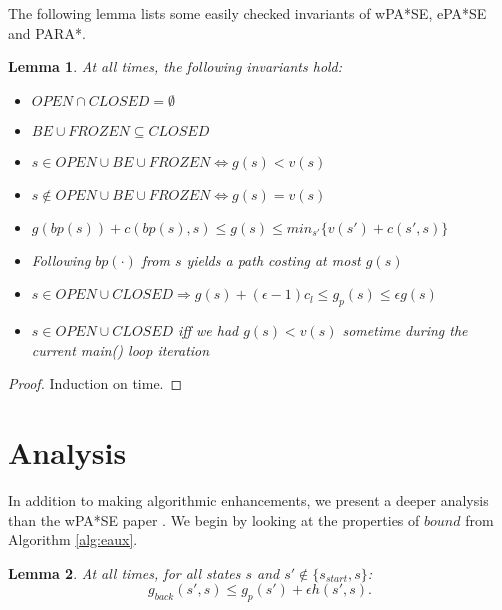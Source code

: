 \documentclass[letterpaper]{article}
\newtheorem{lemma}{Lemma}
\begin{document}
The following lemma lists some easily checked invariants of wPA*SE, ePA*SE and PARA*.

\begin{lemma}
\label{lem:prop}
At all times, the following invariants hold:
\begin{itemize}
\item $OPEN\cap CLOSED = \emptyset$
\item $BE\cup FROZEN \subseteq CLOSED$
\item $s\in OPEN\cup BE\cup FROZEN \Leftrightarrow g(s) < v(s)$
\item $s\notin OPEN\cup BE\cup FROZEN \Leftrightarrow g(s) = v(s)$
\item $g(bp(s)) + c(bp(s),s) \le g(s) \le min_{s'}\{v(s') + c(s',s)\}$
\item Following $bp(\cdot)$ from $s$ yields a path costing at most $g(s)$
\item $s\in OPEN\cup CLOSED \Rightarrow g(s) + (\epsilon-1)c_l \le g_p(s) \le \epsilon g(s)$
\item $s\in OPEN\cup CLOSED$ iff we had $g(s)<v(s)$ sometime during the current main() loop iteration
\end{itemize}
\end{lemma}

\begin{proof}
Induction on time.
\end{proof}

\section{Analysis}

In addition to making algorithmic enhancements, we present a deeper analysis than the wPA*SE paper \cite{}. We begin by looking at the properties of $bound$ from Algorithm \ref{alg:eaux}.

\begin{lemma}
\label{lem:indep}
At all times, for all states $s$ and $s'\notin \{s_{start},s\}$:
\[g_{back}(s',s) \le g_p(s') + \epsilon h(s',s).\]
\end{lemma}
\end{document}
